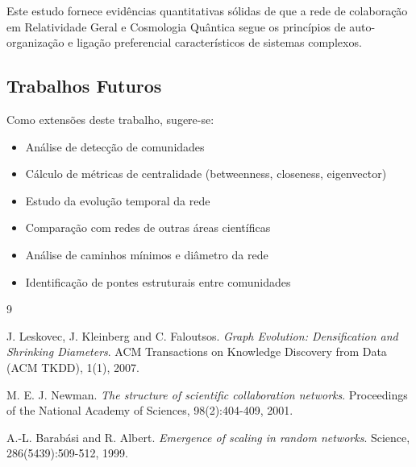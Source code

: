 \documentclass[12pt,a4paper]{article}
\begin{document}
Este estudo fornece evidências quantitativas sólidas de que a rede de colaboração em Relatividade Geral e Cosmologia Quântica segue os princípios de auto-organização e ligação preferencial característicos de sistemas complexos.

\subsection{Trabalhos Futuros}

Como extensões deste trabalho, sugere-se:

\begin{itemize}
    \item Análise de detecção de comunidades
    \item Cálculo de métricas de centralidade (betweenness, closeness, eigenvector)
    \item Estudo da evolução temporal da rede
    \item Comparação com redes de outras áreas científicas
    \item Análise de caminhos mínimos e diâmetro da rede
    \item Identificação de pontes estruturais entre comunidades
\end{itemize}

\begin{thebibliography}{9}

J. Leskovec, J. Kleinberg and C. Faloutsos. 
\textit{Graph Evolution: Densification and Shrinking Diameters}. 
ACM Transactions on Knowledge Discovery from Data (ACM TKDD), 1(1), 2007.

M. E. J. Newman. 
\textit{The structure of scientific collaboration networks}. 
Proceedings of the National Academy of Sciences, 98(2):404-409, 2001.

A.-L. Barabási and R. Albert. 
\textit{Emergence of scaling in random networks}. 
Science, 286(5439):509-512, 1999.

\end{thebibliography}
\end{document}
